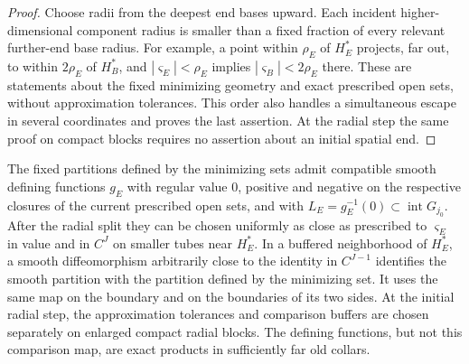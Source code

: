 \begin{proof}
Choose radii from the deepest end bases upward.  Each incident higher-dimensional component radius is
smaller than a fixed fraction of every relevant further-end base radius.
For example, a point within $\rho_E$ of $H_E^*$ projects, far out, to
within $2\rho_E$ of $H_B^*$, and $|\varsigma_E|<\rho_E$ implies
$|\varsigma_B|<2\rho_E$ there.  These are statements about the fixed minimizing
geometry and exact prescribed open sets, without approximation tolerances.  This order
also handles a simultaneous escape in several coordinates and proves the
last assertion.  At the radial step the same proof on compact blocks
requires no assertion about an initial spatial end.
\end{proof}

\begin{lemma}\label{regular:partition}
The fixed partitions defined by the minimizing sets admit compatible smooth defining functions
$g_E$ with regular value $0$, positive and negative on the respective closures of the current prescribed open sets, and with $L_E=g_E^{-1}(0)\subset\operatorname{int}G_{j_0}$.
After the radial split they can be chosen uniformly as close as
prescribed to $\varsigma_E$ in value and in $C^J$ on smaller tubes near $H_E^*$.  In a buffered neighborhood of $H_E^*$, a smooth diffeomorphism
arbitrarily close to the identity in $C^{J-1}$ identifies the smooth
partition with the partition defined by the minimizing set.  It uses the same map on the boundary
and on the boundaries of its two sides.  At the initial radial step,
the approximation tolerances and comparison buffers are chosen separately
on enlarged compact radial blocks.  The defining functions, but not this
comparison map, are exact products in sufficiently far old collars.
\end{lemma}

